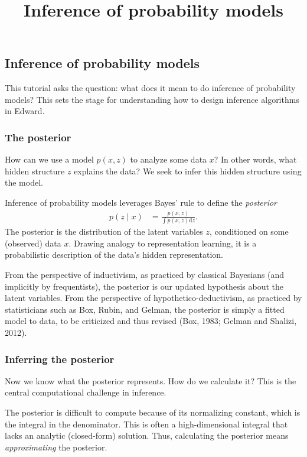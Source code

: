 \title{Inference of probability models}

\subsection{Inference of probability models}

This tutorial asks the question: what does it mean to do inference of
probability models? This sets the stage for understanding how to
design inference algorithms in Edward.

\subsubsection{The posterior}

How can we use a model $p(x,z)$ to analyze some data $x$? In other words,
what hidden structure $z$ explains the data? We seek to infer this
hidden structure using the model.

Inference of probability models leverages Bayes' rule to define the
\emph{posterior}
\begin{align*}
  p(z \mid x)
  &=
  \frac{p(x,z)}{\int p(x,z) \text{d}z}.
\end{align*}
The posterior is the distribution of the latent variables $z$, conditioned on
some (observed) data $x$.
Drawing analogy to representation learning, it is a probabilistic
description of the data's hidden representation.

From the perspective of inductivism, as practiced by classical
Bayesians (and implicitly by frequentists),
the posterior is our updated hypothesis about the latent variables.
From the perspective of hypothetico-deductivism, as practiced by
statisticians such as Box, Rubin, and Gelman, the posterior is simply
a fitted model to data, to be criticized and thus revised (Box, 1983;
Gelman and Shalizi, 2012).



\subsubsection{Inferring the posterior}

Now we know what the posterior represents. How do we calculate it? This is the
central computational challenge in inference.

The posterior is difficult to compute because of its normalizing
constant, which is the integral in the denominator.
This is often a high-dimensional integral that lacks an analytic (closed-form)
solution. Thus, calculating the posterior means \emph{approximating} the
posterior.

